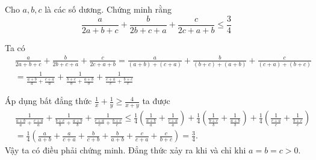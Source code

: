 \begin{problem}
	Cho $a, b, c$ là các số dương. Chứng minh rằng
	\[
		\frac{a}{2a + b + c} + \frac{b}{2b + c + a} + \frac{c}{2c + a + b} \le \frac{3}{4}
	\]
	\solution

	Ta có 
	\begin{align*}
		&\frac{a}{2a + b + c} + \frac{b}{2b + c + a} + \frac{c}{2c + a + b} = 
		\frac{a}{(a + b) + (c + a)} + \frac{b}{(b + c) + (a + b)} + \frac{c}{(c + a) + (b + c)} \\
		&= \frac{1}{\frac{a + b}{a} + \frac{c + a}{a}} + \frac{1}{\frac{b + c}{b} + \frac{a + b}{b}}
		+ \frac{1}{\frac{c + a}{c} + \frac{b + c}{c}}
	\end{align*}

	Áp dụng bất đẳng thức $\displaystyle \frac{1}{x} + \frac{1}{y} \ge \frac{4}{x + y}$ ta được
	\begin{align*}
		&\frac{1}{\frac{a + b}{a} + \frac{c + a}{a}} + \frac{1}{\frac{b + c}{b} + \frac{a + b}{b}}
		+ \frac{1}{\frac{c + a}{c} + \frac{b + c}{c}}
		\le \frac{1}{4}\left(\frac{1}{\frac{a + b}{a}} + \frac{1}{\frac{c + a}{a}}\right)
		+ \frac{1}{4}\left(\frac{1}{\frac{b + c}{b}} + \frac{1}{\frac{a + b}{b}}\right) + 
		\frac{1}{4}\left(\frac{1}{\frac{c + a}{c}} + \frac{1}{\frac{b + c}{c}}\right) \\ 
		&= \frac{1}{4}\left(\frac{a}{a + b} + \frac{a}{c + a} + \frac{b}{c + b} + \frac{b}{a + b}
		+ \frac{c}{c + a} + \frac{c}{b + c}\right) = \frac{3}{4}.
	\end{align*}
	Vậy ta có điều phải chứng minh. Đẳng thức xảy ra khi và chỉ khi $a = b = c > 0$.
\end{problem}